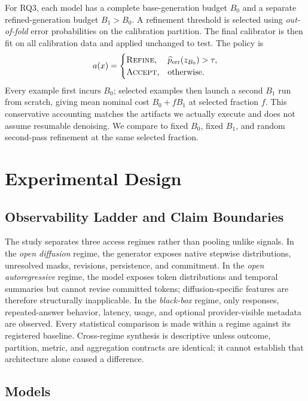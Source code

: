 \documentclass[10pt]{article}
\newcommand{\calp}{\widehat{p}_{\mathrm{err}}}
\begin{document}
For RQ3, each model has a complete base-generation budget $B_0$ and a separate refined-generation budget $B_1>B_0$.
A refinement threshold is selected using \emph{out-of-fold} error probabilities on the calibration partition.
The final calibrator is then fit on all calibration data and applied unchanged to test.
The policy is
\begin{equation}
a(x)=
\begin{cases}
\textsc{Refine}, & \calp(z_{B_0})>\tau,\\
\textsc{Accept}, & \text{otherwise}.
\end{cases}
\end{equation}
Every example first incurs $B_0$; selected examples then launch a second $B_1$ run from scratch, giving mean nominal cost $B_0+fB_1$ at selected fraction $f$. This conservative accounting matches the artifacts we actually execute and does not assume resumable denoising. We compare to fixed $B_0$, fixed $B_1$, and random second-pass refinement at the same selected fraction.

\section{Experimental Design}

\subsection{Observability Ladder and Claim Boundaries}

The study separates three access regimes rather than pooling unlike signals.
In the \emph{open diffusion} regime, the generator exposes native stepwise distributions, unresolved masks, revisions, persistence, and commitment.
In the \emph{open autoregressive} regime, the model exposes token distributions and temporal summaries but cannot revise committed tokens; diffusion-specific features are therefore structurally inapplicable.
In the \emph{black-box} regime, only responses, repeated-answer behavior, latency, usage, and optional provider-visible metadata are observed.
Every statistical comparison is made within a regime against its registered baseline.
Cross-regime synthesis is descriptive unless outcome, partition, metric, and aggregation contracts are identical; it cannot establish that architecture alone caused a difference.

\subsection{Models}
\end{document}
